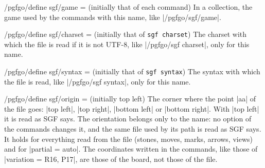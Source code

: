 \begin{key}{/pgfgo/define sgf/game =  (initially that of each command)}
	In a collection, the game used by the commands with this name, like |/pgfgo/sgf/game|.

	\begin{codeexample}
	\end{codeexample}
\end{key}

\begin{key}{/pgfgo/define sgf/charset =  (initially that of \texttt{sgf charset})}
	The charset with which the file is read if it is not UTF-8, like |/pgfgo/sgf charset|, only for this name.

	\begin{codeexample}
	\end{codeexample}
\end{key}

\begin{key}{/pgfgo/define sgf/syntax =  (initially that of \texttt{sgf syntax})}
	The syntax with which the file is read, like |/pgfgo/sgf syntax|, only for this name.

	\begin{codeexample}
	\end{codeexample}
\end{key}

\begin{key}{/pgfgo/define sgf/origin =  (initially top left)}
	The corner where the point |aa| of the file goes: |top left|, |top right|, |bottom left| or |bottom right|. With |top left| it is read as SGF says. The orientation belongs only to the name: no option of the commands changes it, and the same file used by its path is read as SGF says. It holds for everything read from the file (stones, moves, marks, arrows, views) and for |partial = auto|. The coordinates written in the commands, like those of |variation = {R16, P17}|, are those of the board, not those of the file.
\end{key}

